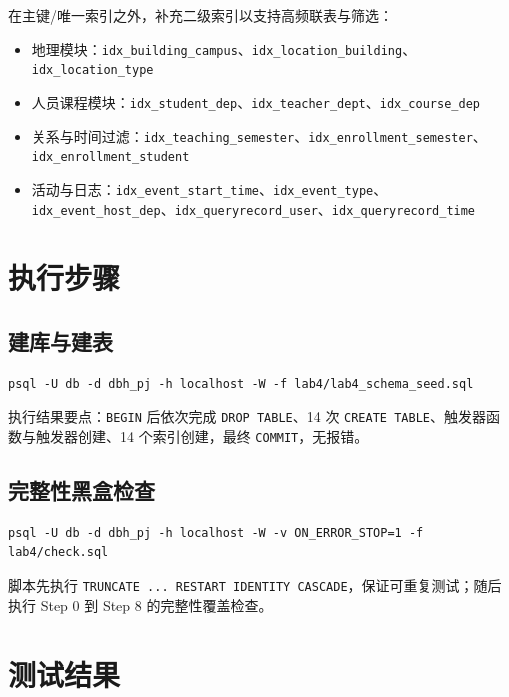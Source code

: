 \documentclass[11pt, a4paper]{article}
\begin{document}
在主键/唯一索引之外，补充二级索引以支持高频联表与筛选：
\begin{itemize}
    \item 地理模块：\texttt{idx\_building\_campus}、\texttt{idx\_location\_building}、\texttt{idx\_location\_type}
    \item 人员课程模块：\texttt{idx\_student\_dep}、\texttt{idx\_teacher\_dept}、\texttt{idx\_course\_dep}
    \item 关系与时间过滤：\texttt{idx\_teaching\_semester}、\texttt{idx\_enrollment\_semester}、\texttt{idx\_enrollment\_student}
    \item 活动与日志：\texttt{idx\_event\_start\_time}、\texttt{idx\_event\_type}、\texttt{idx\_event\_host\_dep}、\texttt{idx\_queryrecord\_user}、\texttt{idx\_queryrecord\_time}
\end{itemize}

\section{执行步骤}

\subsection{建库与建表}

\begin{verbatim}
psql -U db -d dbh_pj -h localhost -W -f lab4/lab4_schema_seed.sql
\end{verbatim}

执行结果要点：\texttt{BEGIN} 后依次完成 \texttt{DROP TABLE}、14 次 \texttt{CREATE TABLE}、触发器函数与触发器创建、14 个索引创建，最终 \texttt{COMMIT}，无报错。

\subsection{完整性黑盒检查}

\begin{verbatim}
psql -U db -d dbh_pj -h localhost -W -v ON_ERROR_STOP=1 -f lab4/check.sql
\end{verbatim}

脚本先执行 \texttt{TRUNCATE ... RESTART IDENTITY CASCADE}，保证可重复测试；随后执行 Step 0 到 Step 8 的完整性覆盖检查。

\section{测试结果}
\end{document}
